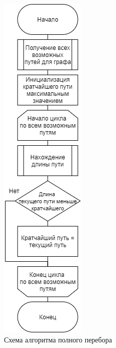 \documentclass[12pt]{report}
\begin{document}
\begin{figure}[H]
        	\centering
        	\includegraphics[scale = 0.8]{BruteForce.png}
        	\caption{Схема алгоритма полного перебора}
        	\label{fig:f_p}
\end{figure}  
\end{document}
